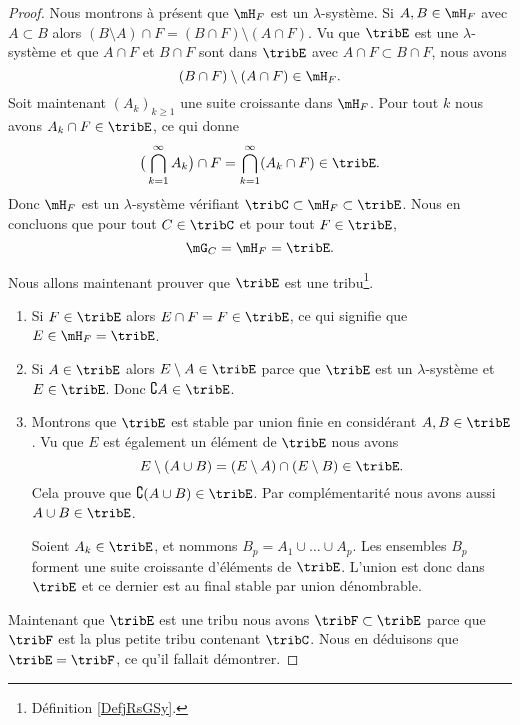 \begin{proof}
    Nous montrons à présent que \( \mH_F\) est un \( \lambda\)-système. Si \( A,B\in\mH_F\) avec \( A\subset B\) alors \( (B\setminus A)\cap F=(B\cap F)\setminus(A\cap F)\). Vu que \( \tribE\) est une \( \lambda\)-système et que \( A\cap F\) et \( B\cap F\) sont dans \( \tribE\) avec \( A\cap F\subset B\cap F\), nous avons
    \begin{equation}
        (B\cap F)\setminus(A\cap F)\in\mH_F.
    \end{equation}
    Soit maintenant \( (A_k)_{k\geq 1}\) une suite croissante dans \( \mH_F\). Pour tout \( k\) nous avons \( A_k\cap F\in\tribE\), ce qui donne
    \begin{equation}
        \big( \bigcap_{k=1}^{\infty}A_k \big)\cap F=\bigcap_{k=1}^{\infty}(A_k\cap F)\in\tribE.
    \end{equation}
    Donc \( \mH_F\) est un \( \lambda\)-système vérifiant \( \tribC\subset\mH_F\subset\tribE\). Nous en concluons que pour tout \( C\in\tribC\) et pour tout \( F\in\tribE\),
    \begin{equation}
        \mG_C=\mH_F=\tribE.
    \end{equation}
    
    Nous allons maintenant prouver que \( \tribE\) est une tribu\footnote{Définition \ref{DefjRsGSy}.}.
    \begin{enumerate}
        \item
            Si \( F\in\tribE\) alors \( E\cap F=F\in\tribE\), ce qui signifie que \( E\in\mH_F=\tribE\).
        \item
            Si \( A\in \tribE\) alors \( E\setminus A\in\tribE\) parce que \( \tribE\) est un \( \lambda\)-système et \( E\in\tribE\). Donc \( \complement A\in\tribE\).
        \item
            Montrons que \( \tribE\) est stable par union finie en considérant \( A,B\in\tribE\). Vu que \( E\) est également un élément de \( \tribE\) nous avons
            \begin{equation}
                E\setminus(A\cup B)=(E\setminus A)\cap(E\setminus B)\in\tribE.
            \end{equation}
            Cela prouve que \( \complement( A\cup B)\in \tribE\). Par complémentarité nous avons aussi \( A\cup B\in\tribE\).
            
            Soient \( A_k\in\tribE\), et nommons \( B_p=A_1\cup\ldots\cup A_p\). Les ensembles \( B_p\) forment une suite croissante d'éléments de \( \tribE\). L'union est donc dans \( \tribE\) et ce dernier est au final stable par union dénombrable.
    \end{enumerate}
    
    Maintenant que \( \tribE\) est une tribu nous avons \( \tribF\subset\tribE\) parce que \( \tribF\) est la plus petite tribu contenant \( \tribC\). Nous en déduisons que \( \tribE=\tribF\), ce qu'il fallait démontrer.
\end{proof}

